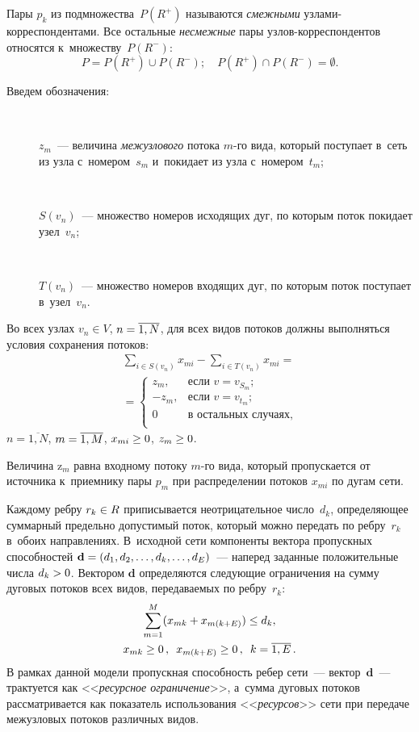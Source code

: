 \begin{multicols}{2}
Пары $p_{k}$ из подмножества~$P(R^{+})$ называются
\textit{смежными} уз\-ла\-ми-кор\-рес\-пон\-ден\-та\-ми. Все остальные
\textit{несмежные} пары уз\-лов-кор\-рес\-пон\-ден\-тов относятся к~множеству~$P(R^{-})$:
\begin{equation*}
P=P(R^{+})\cup P(R^{-});\quad
P(R^{+}) \cap P(R^{-}) = \emptyset.
\end{equation*}

Введем обозначения:
\begin{description}
\item[\,]
$z_{m}$~--- величина \textit{межузлового} потока $m$-го вида,
который поступает в~сеть из узла с~номером~$s_{m }$ и~покидает из
узла с~номером~$t_{m}$;
\item[\,]
$S(v_{n})$~--- множество номеров исходящих дуг, по которым поток
покидает узел~$v_{n}$;
\item[\,]
$T(v_{n})$~--- множество номеров входящих дуг, по которым поток
поступает в~узел~$v_{n}$.
\end{description}

Во всех узлах $v_{n}\in V$, $n\hm=\overline{1,N}$, для всех видов
потоков должны выполняться условия сохранения потоков:
\begin{multline}
\label{eq1} 
\sum\limits_{i\in S(v_n )} x_{mi}-\sum\limits_{i\in T(v_n )} x_{mi}
={}\\
{}=\begin{cases}
z_m, & \mbox{если } v=v^{}_{S_m}; \\
-z_m,&\mbox{если } v=v_{t_m}; \\
0&\mbox{в остальных случаях}, \\
\end{cases}
\end{multline}
$n=\overline{1,N}$, $m\hm=\overline{1,M}$, $x_{mi}\hm\ge 0$,
$z_{m}\hm\ge0$.

Величина {z}$_{m}$ равна входному потоку $m$-го вида, который
пропускается от источника к~приемнику пары $p_{m}$ при
распределении потоков $x_{mi}$ по дугам сети.

Каждому ребру $r_{k}\hm\in R$ приписывается неотрицательное число~$d_{k}$, 
определяющее суммарный предельно допустимый поток,
который можно передать по реб\-ру~$r_{k}$ в~обоих на\-прав\-ле\-ни\-ях. 
В~исходной сети компоненты вектора про\-пуск\-ных способностей
$\mathbf{d}\hm=(d_{1}, d_{2},\dots, d_{k}, \dots, d_{E})$~--- наперед
заданные положительные числа $d_{k}
\hm> 0$. Вектором $\mathbf{d}$ определяются сле\-ду\-ющие ограничения на сумму
дуговых потоков всех видов, пе\-ре\-да\-ва\-емых по реб\-ру~$r_{k}$:
\begin{multline}
\sum\limits_{m=1}^M (x_{mk}+x_{m(k+E)}) \le d_k,\\
 x_{mk}\ge 0\,,\enskip
 x_{m(k+E)}\ge 0\,, \enskip k=\overline {1,E}\,.
 \label{eq2} 
\end{multline}
В рамках данной модели пропускная спо\-соб\-ность ребер сети~--- вектор~$\mathbf{d}$~--- трактуется как <<\textit{ресурсное ограничение}>>,
а~сумма дуговых
 потоков рас\-смат\-ри\-ва\-ет\-ся как показатель использования
<<\textit{ресурсов}>> сети при передаче межузловых потоков
различных видов.


\end{multicols}
